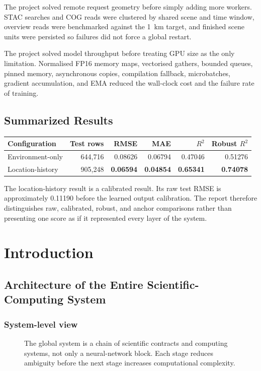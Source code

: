 \documentclass[12pt,a4paper]{report}
\newcommand{\feat}[1]{#1\par}
\begin{document}
\feat{The project solved remote request geometry before simply adding more
workers. STAC searches and COG reads were clustered by shared scene and time
window, overview reads were benchmarked against the 1~km target, and finished
scene units were persisted so failures did not force a global restart.}

\feat{The project solved model throughput before treating GPU size as the only
limitation. Normalised FP16 memory maps, vectorised gathers, bounded queues,
pinned memory, asynchronous copies, compilation fallback, microbatches,
gradient accumulation, and EMA reduced the wall-clock cost and the failure
rate of training.}

\section*{Summarized Results}
\begin{center}
\begin{tabular}{lrrrrr}
\toprule
Configuration & Test rows & RMSE & MAE & $R^2$ & Robust $R^2$\\
\midrule
Environment-only & 644,716 & 0.08626 & 0.06794 & 0.47046 & 0.51276\\
Location-history & 905,248 & \textbf{0.06594} & \textbf{0.04854} &
\textbf{0.65341} & \textbf{0.74078}\\
\bottomrule
\end{tabular}
\end{center}

\feat{The location-history result is a calibrated result. Its raw test RMSE
is approximately 0.11190 before the learned output calibration. The report
therefore distinguishes raw, calibrated, robust, and anchor comparisons rather
than presenting one score as if it represented every layer of the system.}

\chapter{Introduction}
\section{Architecture of the Entire Scientific-Computing System}

\subsection{System-level view}
\begin{figure}[H]
\centering

\caption{The global system is a chain of scientific contracts and computing systems, not only a neural-network block. Each stage reduces ambiguity before the next stage increases computational complexity.}
\label{fig:system}
\end{figure}
\end{document}
